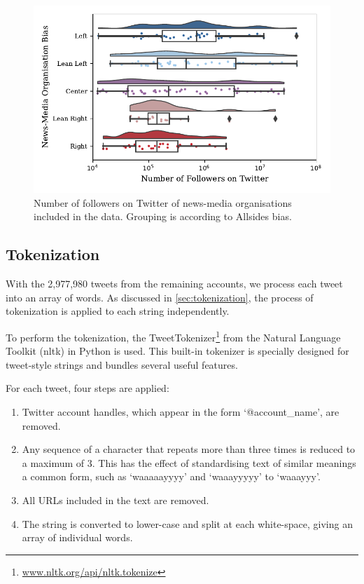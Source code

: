 \begin{figure}[h!]
	\centering
	\includegraphics[width=\textwidth]{chapter1/figs/number_of_follow_by_bias_raincloud}
	\caption{Number of followers on Twitter of news-media organisations included in the data. Grouping is according to Allsides bias.}
	\label{fig:data_number_of_follow_by_bias_raincloud}
\end{figure}

\subsection{Tokenization}

With the 2,977,980 tweets from the remaining accounts, we process each tweet into an array of words. As discussed in \autoref{sec:tokenization}, the process of tokenization is applied to each string independently.

To perform the tokenization, the TweetTokenizer\footnote{\url{www.nltk.org/api/nltk.tokenize}} from the Natural Language Toolkit (nltk) in Python is used. This built-in tokenizer is specially designed for tweet-style strings and bundles several useful features.

For each tweet, four steps are applied:
\begin{enumerate}
	\item Twitter account handles, which appear in the form `@account\_name', are removed. 
	\item Any sequence of a character that repeats more than three times is reduced to a maximum of 3. This has the effect of standardising text of similar meanings a common form, such as `waaaaayyyy' and `waaayyyyy' to `waaayyy'.
	\item All URLs included in the text are removed.  
	\item The string is converted to lower-case and split at each white-space, giving an array of individual words.
\end{enumerate}

